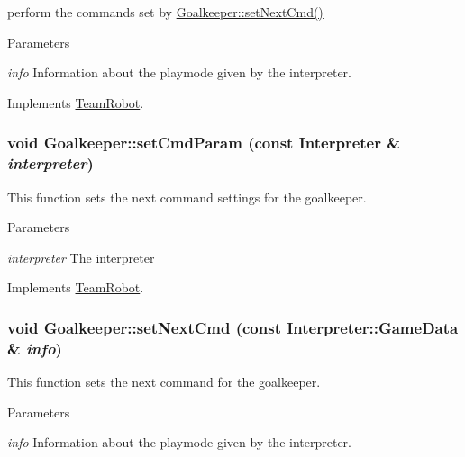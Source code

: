 perform the commands set by \hyperlink{classGoalkeeper_abc394351f7c0d552c6e96da422c772ec}{Goalkeeper::setNextCmd()} 


\begin{DoxyParams}{Parameters}
\item[{\em info}]Information about the playmode given by the interpreter. \end{DoxyParams}


Implements \hyperlink{classTeamRobot_a9b84df51ca16a7203fdb6498ea6741da}{TeamRobot}.

\hypertarget{classGoalkeeper_acfa6fbad0f6b1627fd59cc7cce6ff321}{
\subsubsection[{setCmdParam}]{\setlength{\rightskip}{0pt plus 5cm}void Goalkeeper::setCmdParam (const {\bf Interpreter} \& {\em interpreter})}}
\label{classGoalkeeper_acfa6fbad0f6b1627fd59cc7cce6ff321}


This function sets the next command settings for the goalkeeper. 


\begin{DoxyParams}{Parameters}
\item[{\em interpreter}]The interpreter \end{DoxyParams}


Implements \hyperlink{classTeamRobot_a34c0fd6986c510d4025e5752b3c0e49a}{TeamRobot}.

\hypertarget{classGoalkeeper_abc394351f7c0d552c6e96da422c772ec}{
\subsubsection[{setNextCmd}]{\setlength{\rightskip}{0pt plus 5cm}void Goalkeeper::setNextCmd (const {\bf Interpreter::GameData} \& {\em info})}}
\label{classGoalkeeper_abc394351f7c0d552c6e96da422c772ec}


This function sets the next command for the goalkeeper. 


\begin{DoxyParams}{Parameters}
\item[{\em info}]Information about the playmode given by the interpreter. \end{DoxyParams}


